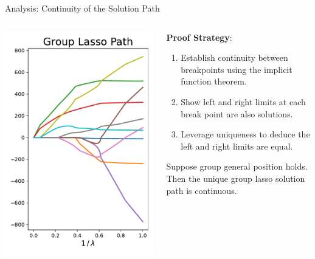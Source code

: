 \documentclass[usenames,dvipsnames,mathserif,notheorems]{beamer}
\begin{document}
\begin{frame}{Analysis: Continuity of the Solution Path}

	\begin{columns}
		\begin{column}{0.5\textwidth}
			\centering
			\includegraphics[width=\textwidth]{assets/group_lasso_path.pdf}
		\end{column}
		\begin{column}{0.5\textwidth}
			\textbf{Proof Strategy}:
			\begin{enumerate}
				\pause
				\item Establish continuity between breakpoints using
				      the implicit function theorem.
				      \pause
				\item Show left and right limits at each break point
				      are also solutions.
				      \pause
				\item Leverage uniqueness to deduce the left and right limits
				      are equal.
			\end{enumerate}
			\pause
			\begin{theorem}
				Suppose group general position holds.
				Then the unique group lasso solution path is continuous.
			\end{theorem}
		\end{column}
	\end{columns}
\end{frame}
\end{document}
